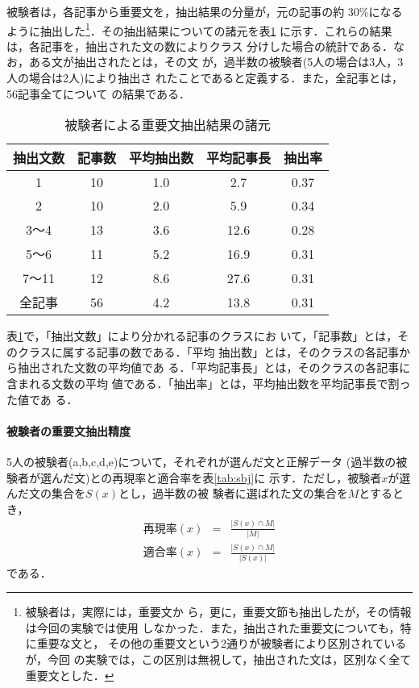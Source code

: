 被験者は，各記事から重要文を，抽出結果の分量が，元の記事の約
30\%になるように抽出した\footnote{被験者は，実際には，重要文か
  ら，更に，重要文節も抽出したが，その情報は今回の実験では使用
  しなかった．また，抽出された重要文についても，特に重要な文と，
  その他の重要文という2通りが被験者により区別されているが，今回
  の実験では，この区別は無視して，抽出された文は，区別なく全て
  重要文とした．}．その抽出結果についての諸元を表\ref{tab:stat}
に示す．これらの結果は，各記事を，抽出された文の数によりクラス
分けした場合の統計である．なお，ある文が抽出されたとは，その文
が，過半数の被験者(5人の場合は3人，3人の場合は2人)により抽出さ
れたことであると定義する．また，全記事とは，56記事全てについて
の結果である．

\begin{table}[htbp]
  \caption{被験者による重要文抽出結果の諸元}
  \begin{center}
    \begin{tabular}{|c|cccc|} \hline
      抽出文数 & 記事数 & 平均抽出数 & 平均記事長& 抽出率\\ \hline
      1        & 10     &    1.0     &     2.7   &  0.37\\
      2        & 10     &    2.0     &     5.9   &  0.34\\
      3〜4     & 13     &    3.6     &    12.6   &  0.28\\
      5〜6     & 11     &    5.2     &    16.9   &  0.31\\
      7〜11    & 12     &    8.6     &    27.6   &  0.31\\ \hline
      全記事   & 56     &    4.2     &    13.8   &  0.31\\ \hline
    \end{tabular}
    \label{tab:stat}
  \end{center}
\end{table}

表\ref{tab:stat}で，「抽出文数」により分かれる記事のクラスにお
いて，「記事数」とは，そのクラスに属する記事の数である．「平均
抽出数」とは，そのクラスの各記事から抽出された文数の平均値であ
る．「平均記事長」とは，そのクラスの各記事に含まれる文数の平均
値である．「抽出率」とは，平均抽出数を平均記事長で割った値であ
る．

\paragraph{被験者の重要文抽出精度}

5人の被験者(a,b,c,d,e)について，それぞれが選んだ文と正解データ
(過半数の被験者が選んだ文)との再現率と適合率を表\ref{tab:sbj}に
示す．ただし，被験者$x$が選んだ文の集合を$S(x)$とし，過半数の被
験者に選ばれた文の集合を$M$とするとき，
\begin{eqnarray}
  \label{eq:recall}
  再現率(x) & = & \frac{|S(x) \cap M|}{|M|}\\
  \label{eq:precision}
  適合率(x) & = & \frac{|S(x) \cap M|}{|S(x)|}
\end{eqnarray}
である．

